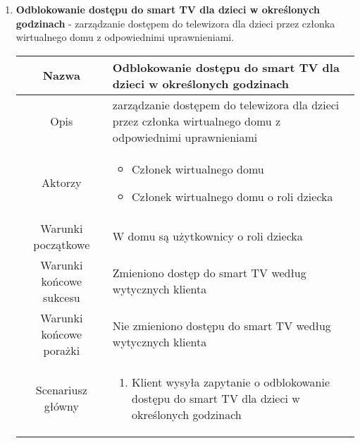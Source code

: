\documentclass{article}
\begin{document}
\begin{enumerate}
\begin{enumerate}
			\item \textbf{Odblokowanie dostępu do smart TV dla dzieci w określonych
				godzinach} - zarządzanie dostępem do telewizora dla dzieci przez członka
				wirtualnego domu z odpowiednimi uprawnieniami.
				\begin{table}[H]
					\centering
					\begin{tabular}{|c|p{7cm}|}
						\hline
						Nazwa                   & \textbf{Odblokowanie dostępu do smart TV dla dzieci w określonych godzinach}                                                                                                                            \\
						\hline
						Opis                    & zarządzanie dostępem do telewizora dla dzieci przez członka wirtualnego domu z odpowiednimi uprawnieniami                                                                                               \\
						\hline
						Aktorzy                 & \begin{itemize}\item Członek wirtualnego domu

\item Członek wirtualnego domu o roli dziecka\end{itemize}                                                                                               \\
						\hline
						Warunki początkowe      & W domu są użytkownicy o roli dziecka                                                                                                                                                                    \\
						\hline
						Warunki końcowe sukcesu & Zmieniono dostęp do smart TV według wytycznych klienta                                                                                                                                                  \\
						\hline
						Warunki końcowe porażki & Nie zmieniono dostępu do smart TV według wytycznych klienta                                                                                                                                             \\
						\hline
						Scenariusz główny       & \begin{enumerate}\item Klient wysyła zapytanie o odblokowanie dostępu do smart TV dla dzieci w określonych godzinach


\end{enumerate}
\end{tabular}
\end{table}
\end{enumerate}
\end{enumerate}
\end{document}
